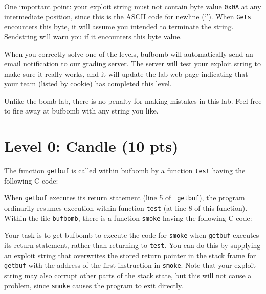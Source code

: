 \documentclass[11pt]{article}
\newenvironment{ccode}%
{\small}%
{}
\begin{document}
One important point: your exploit string must not contain byte value
{\tt 0x0A} at any intermediate position,
since this is the ASCII code for newline (`\verb@\n@').
When {\tt Gets} encounters this byte, it will assume you intended to
terminate the string.  {\sc Sendstring} will warn you if it encounters
this byte value.

When you correctly solve one of the levels, {\sc bufbomb}
will automatically send an email notification to our grading server.
The server will test your exploit string to make sure it really works,
and it will update the lab web page indicating that your team (listed
by cookie) has completed this level.

Unlike the bomb lab, there is no penalty for making mistakes in this
lab.  Feel free to fire away at {\sc bufbomb} with any string you
like.

\section*{Level 0: Candle (10 pts)}

The function {\tt getbuf} is called within {\sc bufbomb} by a function
{\tt test} having the following C code:

\begin{ccode}

\end{ccode}

When {\tt getbuf} executes its return statement (line 5 of {\tt
getbuf}), the program ordinarily resumes execution within function
{\tt test} (at line 8 of this function).
Within the file {\tt bufbomb}, there is a function {\tt smoke} having
the following C code:

\begin{ccode}

\end{ccode}

Your task is to get {\sc bufbomb} to execute the code for {\tt smoke}
when {\tt getbuf} executes its return statement, rather than returning
to {\tt test}.  You can do this by supplying an exploit string that
overwrites the stored return pointer in the stack frame for {\tt
getbuf} with the address of the first instruction in {\tt smoke}.
Note that your exploit string may also corrupt other parts of the
stack state, but this will not cause a problem, since {\tt smoke}
causes the program to exit directly.
\end{document}

